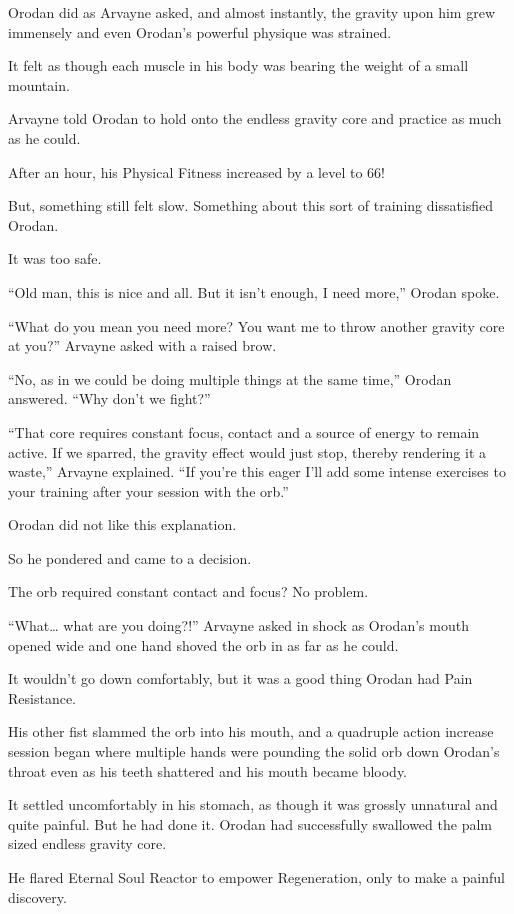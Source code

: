 \documentclass[a4paper,10pt]{book}
\begin{document}
Orodan did as Arvayne asked, and almost instantly, the gravity upon him grew immensely and even Orodan’s powerful physique was strained.\par
It felt as though each muscle in his body was bearing the weight of a small mountain.\par
Arvayne told Orodan to hold onto the endless gravity core and practice as much as he could.\par
After an hour, his Physical Fitness increased by a level to 66!\par
But, something still felt slow. Something about this sort of training dissatisfied Orodan.\par
It was too safe.\par
“Old man, this is nice and all. But it isn’t enough, I need more,” Orodan spoke.\par
“What do you mean you need more? You want me to throw another gravity core at you?” Arvayne asked with a raised brow.\par
“No, as in we could be doing multiple things at the same time,” Orodan answered. “Why don’t we fight?”\par
“That core requires constant focus, contact and a source of energy to remain active. If we sparred, the gravity effect would just stop, thereby rendering it a waste,” Arvayne explained. “If you’re this eager I’ll add some intense exercises to your training after your session with the orb.”\par
Orodan did not like this explanation.\par
So he pondered and came to a decision.\par
The orb required constant contact and focus? No problem.\par
“What… what are you doing?!” Arvayne asked in shock as Orodan’s mouth opened wide and one hand shoved the orb in as far as he could.\par
It wouldn’t go down comfortably, but it was a good thing Orodan had Pain Resistance.\par
His other fist slammed the orb into his mouth, and a quadruple action increase session began where multiple hands were pounding the solid orb down Orodan’s throat even as his teeth shattered and his mouth became bloody.\par
It settled uncomfortably in his stomach, as though it was grossly unnatural and quite painful. But he had done it. Orodan had successfully swallowed the palm sized endless gravity core.\par
He flared Eternal Soul Reactor to empower Regeneration, only to make a painful discovery.\par
\end{document}
